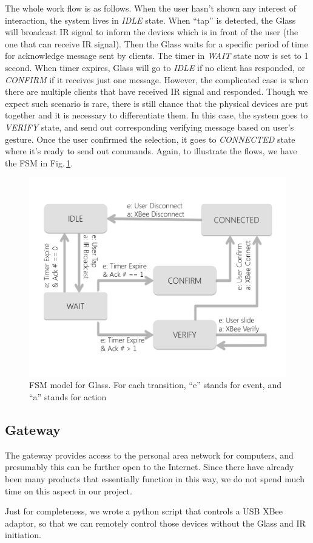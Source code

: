 The whole work flow is as follows. When the user hasn't shown any interest of interaction, the system lives in {\it IDLE} state. When ``tap'' is detected, the Glass will broadcast IR signal to inform the devices which is in front of the user (the one that can receive IR signal). Then the Glass waits for a specific period of time for acknowledge message sent by clients. The timer in {\it WAIT} state now is set to 1 second. When timer expires, Glass will go to {\it IDLE} if no client has responded, or {\it CONFIRM} if it receives just one message. However, the complicated case is when there are multiple clients that have received IR signal and responded. Though we expect such scenario is rare, there is still chance that the physical devices are put together and it is necessary to differentiate them. In this case, the system goes to {\it VERIFY} state, and send out corresponding verifying message based on user's gesture. Once the user confirmed the selection, it goes to {\it CONNECTED} state where it's ready to send out commands. Again, to illustrate the flows, we have the FSM in Fig.\,\ref{fig:glassFSM}.

\begin{figure}
  \centering
  \includegraphics[width=\linewidth]{../figs/glassFSM.pdf}
  \caption{FSM model for Glass. For each transition, ``e'' stands for event, and ``a'' stands for action}
  \label{fig:glassFSM}
\end{figure}

\subsection{Gateway}
\label{sec:gateway}

The gateway provides access to the personal area network for computers, and presumably this can be further open to the Internet. Since there have already been many products \cite{NinjaBlocks, Lockitron} that essentially function in this way, we do not spend much time on this aspect in our project. 

Just for completeness, we wrote a python script that controls a USB XBee adaptor, so that we can remotely control those devices without the Glass and IR initiation.

